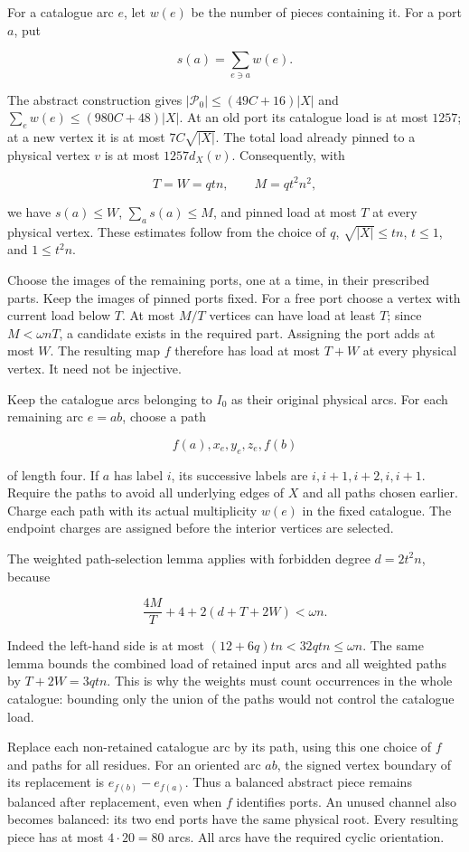 \documentclass[english,11pt,a4paper]{article}
\begin{document}
For a catalogue arc \(e\), let \(w(e)\) be the number of pieces containing it. For a port \(a\), put

\[s(a)=\sum_{e\ni a}w(e).\]

The abstract construction gives \(|\mathcal P_0|\le(49C+16)|X|\) and \(\sum_e w(e)\le(980C+48)|X|\). At an old port its catalogue load is at most \(1257\); at a new vertex it is at most \(7C\sqrt{|X|}\). The total load already pinned to a physical vertex \(v\) is at most \(1257d_X(v)\). Consequently, with

\[T=W=qtn,\qquad M=qt^2n^2,\]

we have \(s(a)\le W\), \(\sum_a s(a)\le M\), and pinned load at most \(T\) at every physical vertex. These estimates follow from the choice of \(q\), \(\sqrt{|X|}\le tn\), \(t\le1\), and \(1\le t^2n\).

Choose the images of the remaining ports, one at a time, in their prescribed parts. Keep the images of pinned ports fixed. For a free port choose a vertex with current load below \(T\). At most \(M/T\) vertices can have load at least \(T\); since \(M<\omega nT\), a candidate exists in the required part. Assigning the port adds at most \(W\). The resulting map \(f\) therefore has load at most \(T+W\) at every physical vertex. It need not be injective.

Keep the catalogue arcs belonging to \(I_0\) as their original physical arcs. For each remaining arc \(e=ab\), choose a path

\[f(a),x_e,y_e,z_e,f(b)\]

of length four. If \(a\) has label \(i\), its successive labels are \(i,i+1,i+2,i,i+1\). Require the paths to avoid all underlying edges of \(X\) and all paths chosen earlier. Charge each path with its actual multiplicity \(w(e)\) in the fixed catalogue. The endpoint charges are assigned before the interior vertices are selected.

The weighted path-selection lemma applies with forbidden degree \(d=2t^2n\), because

\[\frac{4M}{T}+4+2(d+T+2W)<\omega n.\]

Indeed the left-hand side is at most \((12+6q)tn<32qtn\le\omega n\). The same lemma bounds the combined load of retained input arcs and all weighted paths by \(T+2W=3qtn\). This is why the weights must count occurrences in the whole catalogue: bounding only the union of the paths would not control the catalogue load.

Replace each non-retained catalogue arc by its path, using this one choice of \(f\) and paths for all residues. For an oriented arc \(ab\), the signed vertex boundary of its replacement is \(e_{f(b)}-e_{f(a)}\). Thus a balanced abstract piece remains balanced after replacement, even when \(f\) identifies ports. An unused channel also becomes balanced: its two end ports have the same physical root. Every resulting piece has at most \(4\cdot20=80\) arcs. All arcs have the required cyclic orientation.
\end{document}
